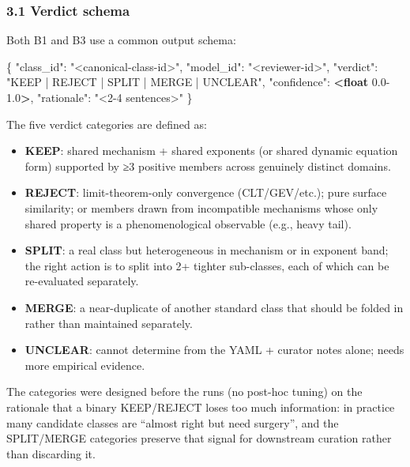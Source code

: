 \documentclass[
  letterpaper,
  11pt]{article}
\newenvironment{Shaded}{}{}
\newcommand{\DataTypeTok}[1]{\textcolor[rgb]{0.56,0.13,0.00}{#1}}
\newcommand{\ErrorTok}[1]{\textcolor[rgb]{1.00,0.00,0.00}{\textbf{#1}}}
\newcommand{\FloatTok}[1]{\textcolor[rgb]{0.25,0.63,0.44}{#1}}
\newcommand{\FunctionTok}[1]{\textcolor[rgb]{0.02,0.16,0.49}{#1}}
\newcommand{\StringTok}[1]{\textcolor[rgb]{0.25,0.44,0.63}{#1}}
\providecommand{\tightlist}{%
  \setlength{\itemsep}{0pt}\setlength{\parskip}{0pt}}
\begin{document}
\subsubsection{3.1 Verdict schema}\label{verdict-schema}

Both B1 and B3 use a common output schema:

\begin{Shaded}
\begin{Highlighting}[]
\FunctionTok{\{}
  \DataTypeTok{"class\_id"}\FunctionTok{:} \StringTok{"\textless{}canonical{-}class{-}id\textgreater{}"}\FunctionTok{,}
  \DataTypeTok{"model\_id"}\FunctionTok{:} \StringTok{"\textless{}reviewer{-}id\textgreater{}"}\FunctionTok{,}
  \DataTypeTok{"verdict"}\FunctionTok{:} \StringTok{"KEEP | REJECT | SPLIT | MERGE | UNCLEAR"}\FunctionTok{,}
  \DataTypeTok{"confidence"}\FunctionTok{:} \ErrorTok{\textless{}float} \FloatTok{0.0{-}1.0}\ErrorTok{\textgreater{}}\FunctionTok{,}
  \DataTypeTok{"rationale"}\FunctionTok{:} \StringTok{"\textless{}2{-}4 sentences\textgreater{}"}
\FunctionTok{\}}
\end{Highlighting}
\end{Shaded}

The five verdict categories are defined as:

\begin{itemize}
\tightlist
\item
  \textbf{KEEP}: shared mechanism + shared exponents (or shared dynamic
  equation form) supported by ≥3 positive members across genuinely
  distinct domains.
\item
  \textbf{REJECT}: limit-theorem-only convergence (CLT/GEV/etc.); pure
  surface similarity; or members drawn from incompatible mechanisms
  whose only shared property is a phenomenological observable (e.g.,
  heavy tail).
\item
  \textbf{SPLIT}: a real class but heterogeneous in mechanism or in
  exponent band; the right action is to split into 2+ tighter
  sub-classes, each of which can be re-evaluated separately.
\item
  \textbf{MERGE}: a near-duplicate of another standard class that should
  be folded in rather than maintained separately.
\item
  \textbf{UNCLEAR}: cannot determine from the YAML + curator notes
  alone; needs more empirical evidence.
\end{itemize}

The categories were designed before the runs (no post-hoc tuning) on the
rationale that a binary KEEP/REJECT loses too much information: in
practice many candidate classes are ``almost right but need surgery'',
and the SPLIT/MERGE categories preserve that signal for downstream
curation rather than discarding it.
\end{document}
